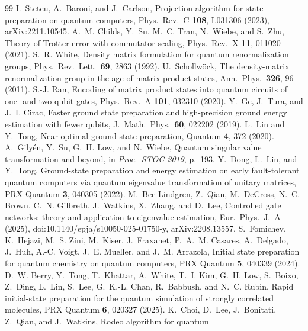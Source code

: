 \documentclass[aps,pra,twocolumn,superscriptaddress,nofootinbib]{revtex4-2}
\begin{document}
\begin{thebibliography}{99}
 I.~Stetcu, A.~Baroni, and J.~Carlson, Projection algorithm for state preparation on
  quantum computers, Phys.\ Rev.\ C \textbf{108}, L031306 (2023), arXiv:2211.10545.
 A.~M. Childs, Y.~Su, M.~C. Tran, N.~Wiebe, and S.~Zhu, Theory of Trotter error with
  commutator scaling, Phys.\ Rev.\ X \textbf{11}, 011020 (2021).
 S.~R. White, Density matrix formulation for quantum renormalization groups,
  Phys.\ Rev.\ Lett.\ \textbf{69}, 2863 (1992).
 U.~Schollw\"ock, The density-matrix renormalization group in the age of matrix
  product states, Ann.\ Phys.\ \textbf{326}, 96 (2011).
 S.-J. Ran, Encoding of matrix product states into quantum circuits of one- and
  two-qubit gates, Phys.\ Rev.\ A \textbf{101}, 032310 (2020).
 Y.~Ge, J.~Tura, and J.~I. Cirac, Faster ground state preparation and high-precision
  ground energy estimation with fewer qubits, J.\ Math.\ Phys.\ \textbf{60}, 022202 (2019).
 L.~Lin and Y.~Tong, Near-optimal ground state preparation, Quantum \textbf{4}, 372
  (2020).
 A.~Gily\'en, Y.~Su, G.~H. Low, and N.~Wiebe, Quantum singular value transformation
  and beyond, in \emph{Proc.\ STOC 2019}, p.~193.
 Y.~Dong, L.~Lin, and Y.~Tong, Ground-state preparation and energy estimation on
  early fault-tolerant quantum computers via quantum eigenvalue transformation of unitary matrices,
  PRX Quantum \textbf{3}, 040305 (2022).
 M.~Bee-Lindgren, Z.~Qian, M.~DeCross, N.~C. Brown, C.~N. Gilbreth, J.~Watkins,
  X.~Zhang, and D.~Lee, Controlled gate networks: theory and application to eigenvalue estimation,
  Eur.\ Phys.\ J.\ A (2025), doi:10.1140/epja/s10050-025-01750-y, arXiv:2208.13557.
 S.~Fomichev, K.~Hejazi, M.~S. Zini, M.~Kiser, J.~Fraxanet, P.~A.~M. Casares,
  A.~Delgado, J.~Huh, A.-C. Voigt, J.~E. Mueller, and J.~M. Arrazola, Initial state preparation for
  quantum chemistry on quantum computers, PRX Quantum \textbf{5}, 040339 (2024).
 D.~W. Berry, Y.~Tong, T.~Khattar, A.~White, T.~I. Kim, G.~H. Low, S.~Boixo, Z.~Ding,
  L.~Lin, S.~Lee, G.~K.-L. Chan, R.~Babbush, and N.~C. Rubin, Rapid initial-state preparation for the
  quantum simulation of strongly correlated molecules, PRX Quantum \textbf{6}, 020327 (2025).
 K.~Choi, D.~Lee, J.~Bonitati, Z.~Qian, and J.~Watkins, Rodeo algorithm for quantum

\end{thebibliography}
\end{document}
